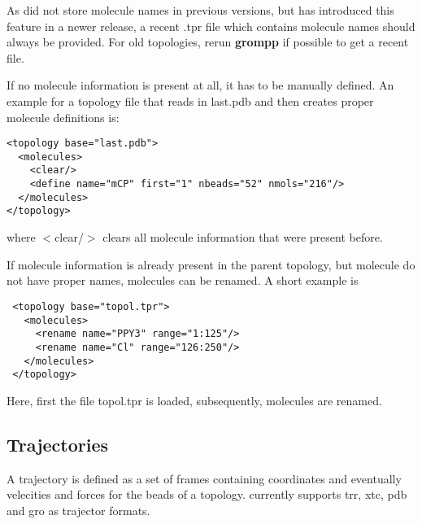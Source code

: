 As \gromacs did not store molecule names in previous versions, but has introduced this feature in a newer release,  a recent .tpr file which contains molecule names should always be provided. For old topologies, rerun \gromacs \textbf{grompp} if possible to get a recent file. 

If no molecule information is present at all, it has to be manually defined. An example for a topology file that reads in last.pdb and then creates proper molecule definitions is:
\begin{lstlisting}
<topology base="last.pdb">
  <molecules>
    <clear/>
    <define name="mCP" first="1" nbeads="52" nmols="216"/>
  </molecules>
</topology>
\end{lstlisting}
where $<$clear/$>$ clears all molecule information that were present before.

If molecule information is already present in the parent topology, but molecule do not have proper names, molecules can be renamed. A short example is
\begin{lstlisting}
 <topology base="topol.tpr">
   <molecules>
     <rename name="PPY3" range="1:125"/>
     <rename name="Cl" range="126:250"/>
   </molecules>
 </topology>
\end{lstlisting}
Here, first the file topol.tpr is loaded, subsequently, molecules are renamed.

\subsection{Trajectories}
A trajectory is defined as a set of frames containing coordinates and eventually velecities and forces for the beads of a topology.
\votca currently supports trr, xtc, pdb and gro as trajector formats.






